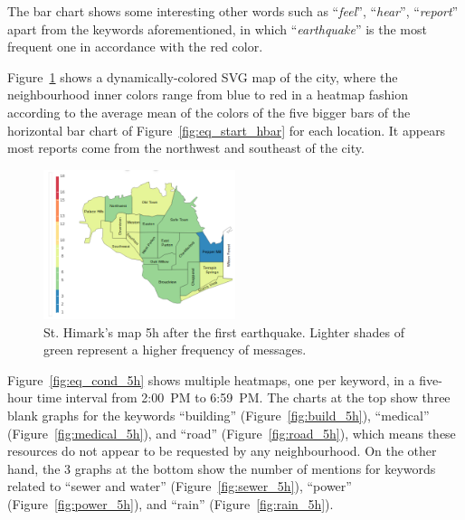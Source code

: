 The bar chart shows some interesting other words such as ``\emph{feel}'',
``\emph{hear}'', ``\emph{report}'' apart from the keywords aforementioned, in
which ``\emph{earthquake}'' is the most frequent one in accordance with the red
color.

Figure~\ref{fig:map_5h} shows a dynamically-colored SVG map of the city, where
the neighbourhood inner colors range from blue to red in a heatmap fashion
according to the average mean of the colors of the five bigger bars of the
horizontal bar chart of Figure~\ref{fig:eq_start_hbar} for each location. It
appears most reports come from the northwest and southeast of the city.

\begin{figure}[!h]
    \centering
    \includegraphics[width=0.50\textwidth]{figs/q1/cond_5h/cond_5h_svg.png}
    \caption{St. Himark's map 5h after the first earthquake. Lighter shades of
    green represent a higher frequency of messages.}
    \label{fig:map_5h}
\end{figure}

Figure~\ref{fig:eq_cond_5h} shows multiple heatmaps, one per keyword, in a
five-hour time interval from 2:00~PM to 6:59~PM. The charts at the top show
three blank graphs for the keywords ``building'' (Figure~\ref{fig:build_5h}),
``medical'' (Figure~\ref{fig:medical_5h}), and ``road''
(Figure~\ref{fig:road_5h}), which means these resources do not appear to be
requested by any neighbourhood. On the other hand, the 3 graphs at the bottom
show the number of mentions for keywords related to ``sewer and water''
(Figure~\ref{fig:sewer_5h}), ``power'' (Figure~\ref{fig:power_5h}), and ``rain''
(Figure~\ref{fig:rain_5h}).

